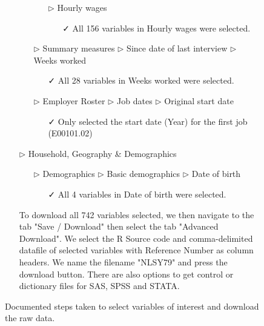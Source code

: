 \documentclass{article}
\begin{document}
\begin{figure}[t]
\begin{tcolorbox}[title = Navigating the data source]
\begin{itemize}
\begin{itemize}
\begin{itemize}
\begin{itemize}
\end{itemize}
\item[$\triangleright$] Hourly wages
\begin{itemize}
\item[\faCheck] All 156 variables in Hourly wages were selected.
\end{itemize}
\end{itemize}
\end{itemize}
\begin{itemize}
\item[$\triangleright$] Summary measures $\triangleright$ Since date of last interview $\triangleright$ Weeks worked
\begin{itemize}
\item[\faCheck] All 28 variables in Weeks worked were selected.
\end{itemize}
\end{itemize}
\begin{itemize}
\item[$\triangleright$] Employer Roster $\triangleright$ Job dates $\triangleright$ Original start date
\begin{itemize}
\item[\faCheck] Only selected the start date (Year) for the first job (E00101.02)
\end{itemize}
\end{itemize}
\item[$\triangleright$] Household, Geography \& Demographics
\begin{itemize}
\item[$\triangleright$] Demographics $\triangleright$ Basic demographics $\triangleright$ Date of birth
\begin{itemize}
\item[\faCheck] All 4 variables in Date of birth were selected. 
\end{itemize}
\end{itemize}
\end{itemize}
\begin{itemize}
\item[\faCloudDownload] To download all 742 variables selected, we then navigate to the tab "Save / Download" then select the tab "Advanced Download". We select the R Source code and comma-delimited datafile of selected variables with Reference Number as column headers. We name the filename "NLSY79" and press the download button. There are also options to get control or dictionary files for SAS, SPSS and STATA. 
\end{itemize}
\end{tcolorbox}
\caption{Documented steps taken to select variables of interest and download the raw data.\label{fig:source-nav}}
\end{figure}
\end{document}
